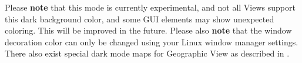 Please \textbf{note} that this mode is currently experimental, and not all Views support this dark background color, and some GUI elements may show unexpected coloring. This will be improved in the future. Please also \textbf{note} that the window decoration color can only be changed using your Linux window manager settings. \\

There also exist special dark mode maps for Geographic View as described in .


